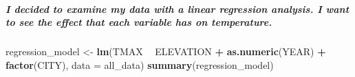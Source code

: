 \documentclass[]{article}
\newenvironment{Shaded}{\begin{snugshade}}{\end{snugshade}}
\newcommand{\DataTypeTok}[1]{\textcolor[rgb]{0.13,0.29,0.53}{#1}}
\newcommand{\KeywordTok}[1]{\textcolor[rgb]{0.13,0.29,0.53}{\textbf{#1}}}
\newcommand{\NormalTok}[1]{#1}
\newcommand{\OperatorTok}[1]{\textcolor[rgb]{0.81,0.36,0.00}{\textbf{#1}}}
\newcommand{\StringTok}[1]{\textcolor[rgb]{0.31,0.60,0.02}{#1}}
\let\oldsubparagraph\subparagraph
\renewcommand{\subparagraph}[1]{\oldsubparagraph{#1}\mbox{}}
\begin{document}
\hypertarget{i-decided-to-examine-my-data-with-a-linear-regression-analysis.-i-want-to-see-the-effect-that-each-variable-has-on-temperature.}{%
\subparagraph{I decided to examine my data with a linear regression
analysis. I want to see the effect that each variable has on
temperature.}\label{i-decided-to-examine-my-data-with-a-linear-regression-analysis.-i-want-to-see-the-effect-that-each-variable-has-on-temperature.}}

\begin{Shaded}
\begin{Highlighting}[]
\NormalTok{regression_model <-}\StringTok{ }\KeywordTok{lm}\NormalTok{(TMAX }\OperatorTok{~}\StringTok{ }\NormalTok{ELEVATION }\OperatorTok{+}\StringTok{ }\KeywordTok{as.numeric}\NormalTok{(YEAR) }\OperatorTok{+}\StringTok{ }\KeywordTok{factor}\NormalTok{(CITY), }\DataTypeTok{data =}\NormalTok{ all_data)}
\KeywordTok{summary}\NormalTok{(regression_model)}
\end{Highlighting}
\end{Shaded}
\end{document}
